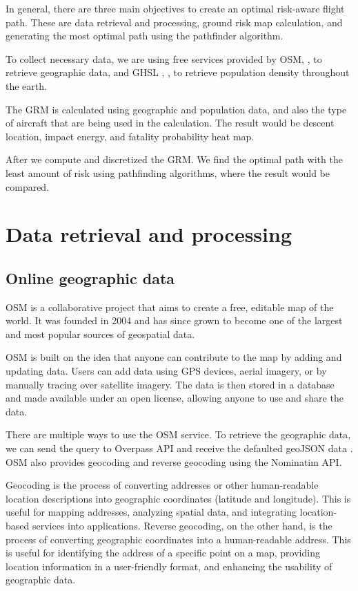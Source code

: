 \documentclass[12pt]{report}
\begin{document}
        In general, there are three main objectives to create an optimal risk-aware flight path. These are data
        retrieval and processing, ground risk map calculation, and generating the most optimal path using the pathfinder
        algorithm.

        To collect necessary data, we are using free services provided by \ac{OSM},
        \cite{openstreetmap_contributors_planet_2017}, to retrieve geographic data, and \ac{GHSL} ,
        \cite{commission_ghsl_2023}, to retrieve population density throughout the earth.

        The \ac{GRM} is calculated using geographic and population data, and also the type of aircraft that are being
        used in the calculation. The result would be descent location, impact energy, and fatality probability heat map. 
        
        After we compute and discretized the GRM. We find the optimal path with the least amount of risk using
        pathfinding algorithms, where the result would be compared.

    \section{Data retrieval and processing}
        \subsection{Online geographic data}
        OSM is a collaborative project that aims to create a free, editable map of the world. It was founded in 2004 and
        has since grown to become one of the largest and most popular sources of geospatial data.
            
        OSM is built on the idea that anyone can contribute to the map by adding and updating data. Users can add data
        using \ac{GPS} devices, aerial imagery, or by manually tracing over satellite imagery. The data is then stored
        in a database and made available under an open license, allowing anyone to use and share the data.
            
        There are multiple ways to use the OSM service. To retrieve the geographic data, we can send the query to
        Overpass \ac{API} and receive the defaulted \ac{geoJSON} data \cite{openstreet_overpass_2022}. OSM also provides
        geocoding and reverse geocoding using the Nominatim API.
            
        Geocoding is the process of converting addresses or other human-readable location descriptions into geographic
        coordinates (latitude and longitude). This is useful for mapping addresses, analyzing spatial data, and
        integrating location-based services into applications. Reverse geocoding, on the other hand, is the process of
        converting geographic coordinates into a human-readable address. This is useful for identifying the address of a
        specific point on a map, providing location information in a user-friendly format, and enhancing the usability
        of geographic data.
\end{document}
